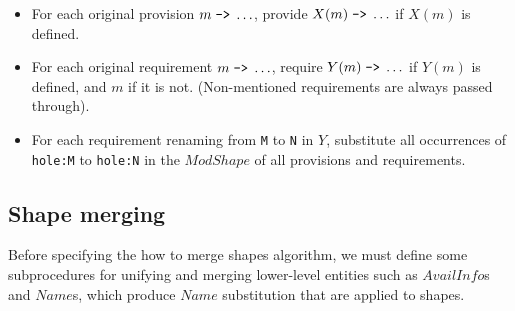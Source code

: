 \documentclass{article}
\newcommand{\I}[1]{\ensuremath{\mathit{#1}}}
\begin{document}
\begin{itemize}
    \item For each original provision $m\; \verb|->|\; \ldots$, provide
          $X (m)\; \verb|->|\; \ldots$ if $X (m)$ is defined.
    \item For each original requirement $m\; \verb|->|\; \ldots$, require
          $Y (m)\; \verb|->|\; \ldots$ if $Y (m)$ is defined, and $m$ if it is not.
          (Non-mentioned requirements are always passed through).
    \item For each requirement renaming from \verb|M| to \verb|N| in $Y$, substitute
          all occurrences of \verb|hole:M| to \verb|hole:N| in the \I{ModShape}
          of all provisions and requirements.
\end{itemize}

\subsection{Shape merging}
Before specifying the how to merge shapes algorithm, we must define some subprocedures
for unifying and merging lower-level entities such as \I{AvailInfo}s and \I{Name}s,
which produce \I{Name} substitution that are applied to shapes.
\end{document}
